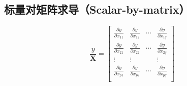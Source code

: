 \documentclass[12pt]{article}
\begin{document}
\subsection{标量对矩阵求导（Scalar-by-matrix）}
$$
\frac{y}{\mathbf{X}} = 
\begin{bmatrix}
    \frac{\partial y}{\partial x_{11}} &
    \frac{\partial y}{\partial x_{12}} & 
    \cdots &
    \frac{\partial y}{\partial x_{1q}} \\
    \frac{\partial y}{\partial x_{21}} &
    \frac{\partial y}{\partial x_{22}} & 
    \cdots &
    \frac{\partial y}{\partial x_{2q}} \\
    \vdots & \vdots &  & \vdots \\
    \frac{\partial y}{\partial x_{p1}} &
    \frac{\partial y}{\partial x_{p2}} & 
    \cdots &
    \frac{\partial y}{\partial x_{pq}} \\
\end{bmatrix}
$$
\end{document}
